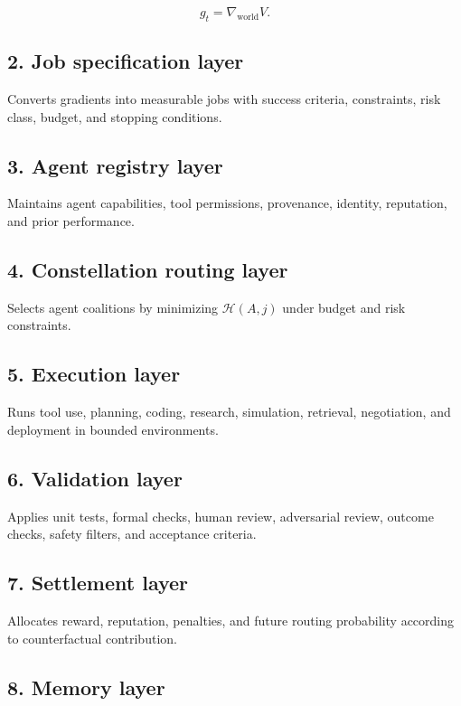 \documentclass[
  11pt,
]{article}
\begin{document}
\[
g_t=\nabla_{\text{world}}V.
\]

\subsection{2. Job specification layer}\label{job-specification-layer}

Converts gradients into measurable jobs with success criteria,
constraints, risk class, budget, and stopping conditions.

\subsection{3. Agent registry layer}\label{agent-registry-layer}

Maintains agent capabilities, tool permissions, provenance, identity,
reputation, and prior performance.

\subsection{4. Constellation routing
layer}\label{constellation-routing-layer}

Selects agent coalitions by minimizing \(\mathcal{H}(A,j)\) under budget
and risk constraints.

\subsection{5. Execution layer}\label{execution-layer}

Runs tool use, planning, coding, research, simulation, retrieval,
negotiation, and deployment in bounded environments.

\subsection{6. Validation layer}\label{validation-layer}

Applies unit tests, formal checks, human review, adversarial review,
outcome checks, safety filters, and acceptance criteria.

\subsection{7. Settlement layer}\label{settlement-layer}

Allocates reward, reputation, penalties, and future routing probability
according to counterfactual contribution.

\subsection{8. Memory layer}\label{memory-layer}
\end{document}
